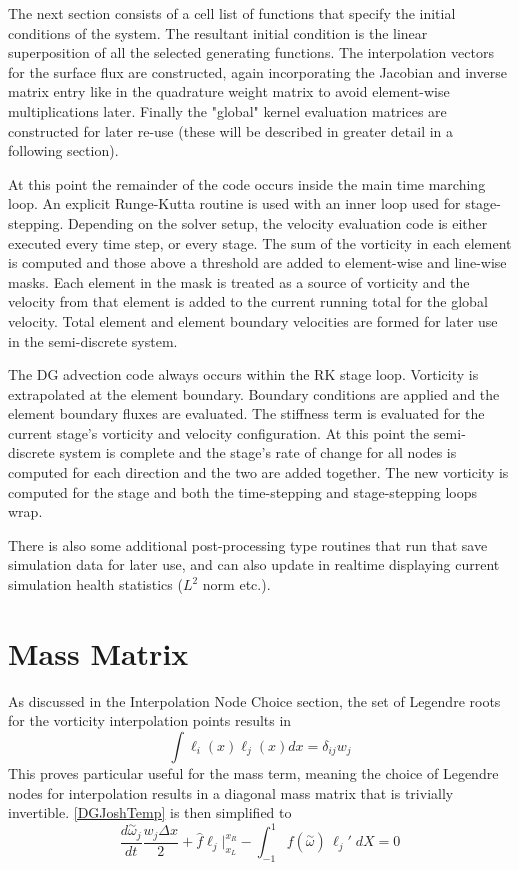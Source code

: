 \documentclass[letterpaper,12pt]{report}
\newcommand{\be}{\begin{equation}}
\newcommand{\ben}[1]{\begin{equation}\label{#1}}
\newcommand{\ee}{\end{equation}}
\newcommand{\aomega}{\overset{\sim}{\omega}}				%
\begin{document}
The next section consists of a cell list of functions that specify the initial conditions of the system. The resultant initial condition is the linear superposition of all the selected generating functions. The interpolation vectors for the surface flux are constructed, again incorporating the Jacobian and inverse matrix entry like in the quadrature weight matrix to avoid element-wise multiplications later. Finally the "global" kernel evaluation matrices are constructed for later re-use (these will be described in greater detail in a following section).

At this point the remainder of the code occurs inside the main time marching loop. An explicit Runge-Kutta routine is used with an inner loop used for stage-stepping. Depending on the solver setup, the velocity evaluation code is either executed every time step, or every stage. The sum of the vorticity in each element is computed and those above a threshold are added to element-wise and line-wise masks. Each element in the mask is treated as a source of vorticity and the velocity from that element is added to the current running total for the global velocity. Total element and element boundary velocities are formed for later use in the semi-discrete system.

The DG advection code always occurs within the RK stage loop. Vorticity is extrapolated at the element boundary. Boundary conditions are applied and the element boundary fluxes are evaluated. The stiffness term is evaluated for the current stage's vorticity and velocity configuration. At this point the semi-discrete system is complete and the stage's rate of change for all nodes is computed for each direction and the two are added together. The new vorticity is computed for the stage and both the time-stepping and stage-stepping loops wrap.

There is also some additional post-processing type routines that run that save simulation data for later use, and can also update in realtime displaying current simulation health statistics ($L^2$ norm etc.).
%
\section{Mass Matrix}
As discussed in the Interpolation Node Choice section, the set of Legendre roots for the vorticity interpolation points results in
\be \int \ell_i(x) \ell_j(x) dx = \delta_{ij} w_j \ee
This proves particular useful for the mass term, meaning the choice of Legendre nodes for interpolation results in a diagonal mass matrix that is trivially invertible. \eqref{DGJoshTemp} is then simplified to
\ben{DGJoshTemp2} \frac{d \aomega_j}{dt} \frac{w_j \Delta x}{2}
+\hat{f}\ell_j \Big|^{x_R}_{x_L} 
- \int_{-1}^{1} f(\aomega) \, \ell_j' \;dX = 0 \ee
\end{document}
